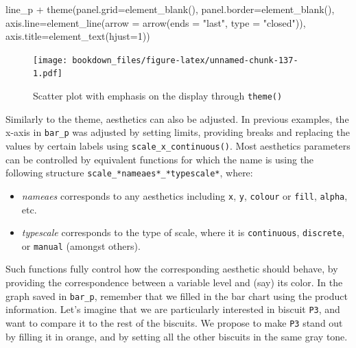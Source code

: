 \documentclass[
]{krantz}
\makeatletter
\newenvironment{Shaded}{\begin{snugshade}}{\end{snugshade}}
\newcommand{\AttributeTok}[1]{\textcolor[rgb]{0.61,0.61,0.61}{#1}}
\newcommand{\DecValTok}[1]{\textcolor[rgb]{0.06,0.06,0.06}{#1}}
\newcommand{\FunctionTok}[1]{\textcolor[rgb]{0,0,0}{#1}}
\newcommand{\NormalTok}[1]{#1}
\newcommand{\SpecialCharTok}[1]{\textcolor[rgb]{0,0,0}{#1}}
\newcommand{\StringTok}[1]{\textcolor[rgb]{0.5,0.5,0.5}{#1}}
\providecommand{\tightlist}{%
  \setlength{\itemsep}{0pt}\setlength{\parskip}{0pt}}
\newenvironment{kframe}{%
\medskip{}
\setlength{\fboxsep}{.8em}
 \def\at@end@of@kframe{}%
 \ifinner\ifhmode%
  \def\at@end@of@kframe{\end{minipage}}%
  \begin{minipage}{\columnwidth}%
 \fi\fi%
 \def\FrameCommand##1{\hskip\@totalleftmargin \hskip-\fboxsep
 \colorbox{shadecolor}{##1}\hskip-\fboxsep
     \hskip-\linewidth \hskip-\@totalleftmargin \hskip\columnwidth}%
 \MakeFramed {\advance\hsize-\width
   \@totalleftmargin\z@ \linewidth\hsize
   \@setminipage}}%
 {\par\unskip\endMakeFramed%
 \at@end@of@kframe}
\renewenvironment{Shaded}{\begin{kframe}}{\end{kframe}}
\makeatother
\begin{document}
\begin{Shaded}
\begin{Highlighting}[]
\NormalTok{line\_p }\SpecialCharTok{+}
  \FunctionTok{theme}\NormalTok{(}\AttributeTok{panel.grid=}\FunctionTok{element\_blank}\NormalTok{(), }
        \AttributeTok{panel.border=}\FunctionTok{element\_blank}\NormalTok{(),}
        \AttributeTok{axis.line=}\FunctionTok{element\_line}\NormalTok{(}\AttributeTok{arrow =} \FunctionTok{arrow}\NormalTok{(}\AttributeTok{ends =} \StringTok{"last"}\NormalTok{, }
                                             \AttributeTok{type =} \StringTok{"closed"}\NormalTok{)),}
        \AttributeTok{axis.title=}\FunctionTok{element\_text}\NormalTok{(}\AttributeTok{hjust=}\DecValTok{1}\NormalTok{))}
\end{Highlighting}
\end{Shaded}

\begin{figure}
\centering
\texttt{[image: bookdown\_files/figure-latex/unnamed-chunk-137-1.pdf]}
\caption{\label{fig:unnamed-chunk-137}Scatter plot with emphasis on the display through \texttt{theme()}}
\end{figure}

Similarly to the theme, aesthetics can also be adjusted. In previous examples, the x-axis in \texttt{bar\_p} was adjusted by setting limits, providing breaks and replacing the values by certain labels using \texttt{scale\_x\_continuous()}.
Most aesthetics parameters can be controlled by equivalent functions for which the name is using the following structure \texttt{scale\_*nameaes*\_*typescale*}, where:

\begin{itemize}
\tightlist
\item
  \emph{nameaes} corresponds to any aesthetics including \texttt{x}, \texttt{y}, \texttt{colour} or \texttt{fill}, \texttt{alpha}, etc.
\item
  \emph{typescale} corresponds to the type of scale, where it is \texttt{continuous}, \texttt{discrete}, or \texttt{manual} (amongst others).
\end{itemize}

Such functions fully control how the corresponding aesthetic should behave, by providing the correspondence between a variable level and (say) its color.
In the graph saved in \texttt{bar\_p}, remember that we filled in the bar chart using the product information. Let's imagine that we are particularly interested in biscuit \texttt{P3}, and want to compare it to the rest of the biscuits. We propose to make \texttt{P3} stand out by filling it in orange, and by setting all the other biscuits in the same gray tone.
\end{document}
